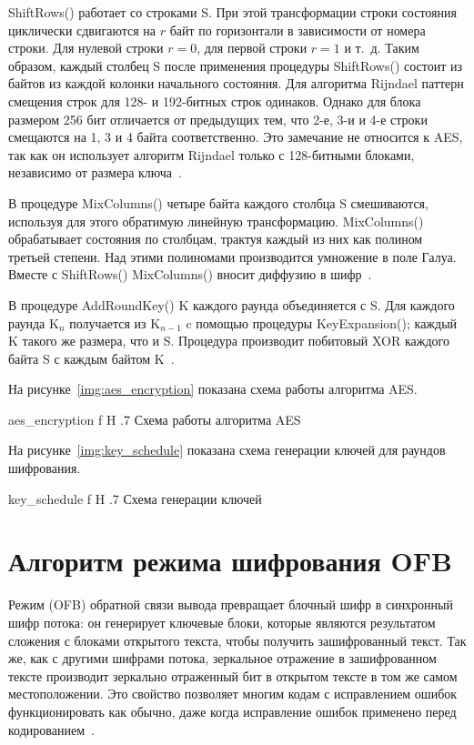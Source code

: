 \documentclass{bmstu}
\begin{document}
ShiftRows() работает со строками S. 
При этой трансформации строки состояния циклически сдвигаются на $r$ байт по горизонтали в зависимости от номера строки. 
Для нулевой строки $r = 0$, для первой строки $r = 1$ и т.~д. 
Таким образом, каждый столбец S после применения процедуры ShiftRows() состоит из байтов из каждой колонки начального состояния. 
Для алгоритма Rijndael паттерн смещения строк для 128- и 192-битных строк одинаков. Однако для блока размером 256 бит отличается от предыдущих тем, что 2-е, 3-и и 4-е строки смещаются на 1, 3 и 4 байта соответственно. 
Это замечание не относится к AES, так как он использует алгоритм Rijndael только с 128-битными блоками, независимо от размера ключа~\cite{wiki-aes}.

В процедуре MixColumns() четыре байта каждого столбца S смешиваются, используя для этого обратимую линейную трансформацию. 
MixColumns() обрабатывает состояния по столбцам, трактуя каждый из них как полином третьей степени. 
Над этими полиномами производится умножение в поле Галуа. 
Вместе с ShiftRows() MixColumns() вносит диффузию в шифр~\cite{wiki-aes}. 

В процедуре AddRoundKey() K каждого раунда объединяется с S. 
Для каждого раунда K$_{n}$ получается из K$_{n-1}$ c помощью процедуры KeyExpansion(); каждый K такого же размера, что и S. 
Процедура производит побитовый XOR каждого байта S с каждым байтом K~\cite{wiki-aes}. 

На рисунке~\ref{img:aes_encryption} показана схема работы алгоритма AES.

    {aes_encryption}
    {f}
    {H}
    {.7\textwidth}
    {Схема работы алгоритма AES~\cite{wadday}}

\pagebreak
На рисунке~\ref{img:key_schedule} показана схема генерации ключей для раундов шифрования.

    {key_schedule}
    {f}
    {H}
    {.7\textwidth}
    {Схема генерации ключей~\cite{key-schedule}}

\chapter{Алгоритм режима шифрования OFB}

Режим (OFB) обратной связи вывода превращает блочный шифр в синхронный шифр потока: он генерирует ключевые блоки, которые являются результатом сложения с блоками открытого текста, чтобы получить зашифрованный текст. 
Так же, как с другими шифрами потока, зеркальное отражение в зашифрованном тексте производит зеркально отраженный бит в открытом тексте в том же самом местоположении. 
Это свойство позволяет многим кодам с исправлением ошибок функционировать как обычно, даже когда исправление ошибок применено перед кодированием~\cite{wiki-ofb}.
\end{document}
